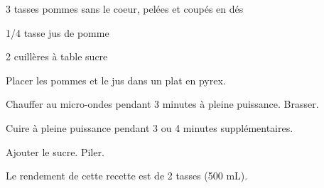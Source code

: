 


\totaltime{}


\begin{ingredients}
    \item 3 tasses pommes sans le coeur, pelées et coupés en dés
    \item 1/4 tasse jus de pomme
    \item 2 cuillères à table sucre
\end{ingredients}

\begin{steps}
    \item Placer les pommes et le jus dans un plat en pyrex.
    \item Chauffer au micro-ondes pendant 3 minutes à pleine puissance. Brasser.
    \item Cuire à pleine puissance pendant 3 ou 4 minutes supplémentaires.
    \item Ajouter le sucre. Piler.
    \item Le rendement de cette recette est de 2 tasses (500 mL).
\end{steps}
